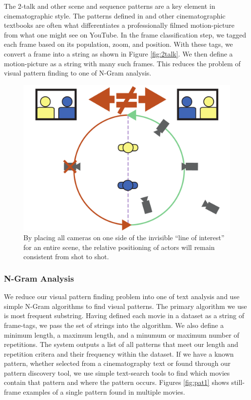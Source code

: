 The 2-talk and other scene and sequence patterns are a key element in cinematographic style. The patterns defined in \cite{arijon_grammar_1991} and other cinematographic textbooks are often what differentiates a professionally filmed motion-picture from what one might see on YouTube. In the frame classification step, we tagged each frame based on its population, zoom, and position. With these tags, we convert a frame into a string as shown in Figure \ref{fig:2talk}. We then define a motion-picture as a string with many such frames. This reduces the problem of visual pattern finding to one of N-Gram analysis.

\begin{figure}[tb]
\begin{center}
\includegraphics[width=0.5\linewidth]
    {fig/lineOfAction.pdf}
\end{center}
\caption{By placing all cameras on one side of the invisible ``line of interest'' for an entire scene, the relative positioning of actors will remain consistent from shot to shot.}
\label{fig:lineOfInterest}
\end{figure}

\subsubsection*{N-Gram Analysis}

We reduce our visual pattern finding problem into one of text analysis and use simple N-Gram algorithms to find visual patterns. The primary algorithm we use is most frequent substring. Having defined each movie in a dataset as a string of frame-tags, we pass the set of strings into the algorithm. We also define a minimum length, a maximum length, and a minumum or maximum number of repetitions. The system outputs a list of all patterns that meet our length and repetition critera and their frequency within the dataset. If we have a known pattern, whether selected from a cinematography text or found through our pattern discovery tool, we use simple text-search tools to find which movies contain that pattern and where the pattern occurs. Figures \ref{fig:pat1} shows still-frame examples of a single pattern found in multiple movies.


